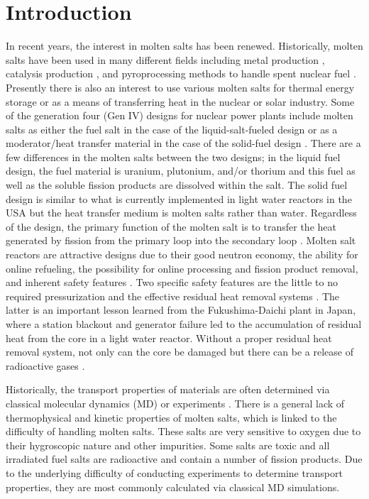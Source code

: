 \documentclass[review]{elsarticle}
\begin{document}
\section{Introduction}
In recent years, the interest in molten salts has been renewed. Historically, molten salts have been used in many different fields including metal production \cite{Zhu2014, VAHIDI2018178}, catalysis production \cite{JIN20202382, HU20204244}, and pyroprocessing methods to handle spent nuclear fuel \cite{CHOI2015572, osti_22107867}. Presently there is also an interest to use various molten salts for thermal energy storage or as a means of transferring heat in the nuclear or solar industry. Some of the generation four (Gen IV) designs for nuclear power plants include molten salts as either the fuel salt in the case of the liquid-salt-fueled design \cite{doi:10.1080/00295450.2019.1586372} or as a moderator/heat transfer material in the case of the solid-fuel design \cite{doi:10.13182/NSE90-374}. There are a few differences in the molten salts between the two designs; in the liquid fuel design, the fuel material is uranium, plutonium, and/or thorium and this fuel as well as the soluble fission products are dissolved within the salt. The solid fuel design is similar to what is currently implemented in light water reactors in the USA but the heat transfer medium is molten salts rather than water. Regardless of the design, the primary function of the molten salt is to transfer the heat generated by fission from the primary loop into the secondary loop \cite{gakhar2021molten}. Molten salt reactors are attractive designs due to their good neutron economy, the ability for online refueling, the possibility for online processing and fission product removal, and inherent safety features \cite{leblanc2010molten}. Two specific safety features are the little to no required pressurization \cite{leblanc2017integral} and the effective residual heat removal systems \cite{SUN2014149}. The latter is an important lesson learned from the Fukushima-Daichi plant in Japan, where a station blackout and generator failure led to the accumulation of residual heat from the core in a light water reactor. Without a proper residual heat removal system, not only can the core be damaged but there can be a release of radioactive gases \cite{SUN2014149}.



Historically, the transport properties of materials are often determined via classical molecular dynamics (MD) or experiments \cite{WANG2014262}. There is a general lack of thermophysical and kinetic properties of molten salts, which is linked to the difficulty of handling molten salts. These salts are very sensitive to oxygen due to their hygroscopic nature and other impurities. Some salts are toxic and all irradiated fuel salts are radioactive and contain a number of fission products. Due to the underlying difficulty of conducting experiments to determine transport properties, they are most commonly calculated via classical MD simulations. 
\end{document}
